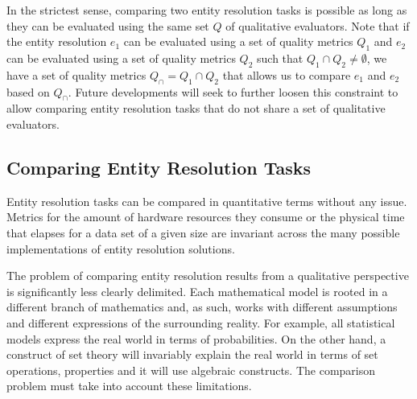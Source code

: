 \documentclass[11pt]{article}
\begin{document}
    In the strictest sense, comparing two entity resolution tasks is possible as
    long as they can be evaluated using the same set $Q$ of qualitative
    evaluators.
    Note that if the entity resolution $e_1$ can be evaluated using a set of
    quality metrics $Q_1$ and $e_2$ can be evaluated using a set of quality
    metrics $Q_2$ such that $Q_1 \cap Q_2 \neq \emptyset$, we have a set of
    quality metrics $Q_\cap = Q_1 \cap Q_2$ that allows us to compare $e_1$ and
    $e_2$ based on $Q_\cap$.
    Future developments will seek to further loosen this constraint to allow
    comparing entity resolution tasks that do not share a set of qualitative
    evaluators.

    \subsection[cert]{Comparing Entity Resolution Tasks}\label{subsec:cert}

    Entity resolution tasks can be compared in quantitative terms without any
    issue.
    Metrics for the amount of hardware resources they consume or the physical
    time that elapses for a data set of a given size are invariant across the
    many possible implementations of entity resolution solutions.

    The problem of comparing entity resolution results from a qualitative
    perspective is significantly less clearly delimited.
    Each mathematical model is rooted in a different branch of mathematics and,
    as such, works with different assumptions and different expressions of the
    surrounding reality.
    For example, all statistical models express the real world in terms of
    probabilities.
    On the other hand, a construct of set theory will invariably explain the
    real world in terms of set operations, properties and it will use algebraic
    constructs.
    The comparison problem must take into account these limitations.
\end{document}
